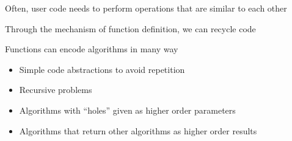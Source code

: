 \documentclass{beamer}
\begin{document}
\begin{slide}{
\item Often, user code needs to perform operations that are similar to each other
\item Through the mechanism of function definition, we can recycle code
\item Functions can encode algorithms in many way
\begin{itemize}
\item Simple code abstractions to avoid repetition
\item Recursive problems
\item Algorithms with ``holes'' given as higher order parameters
\item Algorithms that return other algorithms as higher order results
\end{itemize}
}\end{slide}

\begin{thankyou}
\end{thankyou}
\end{document}
